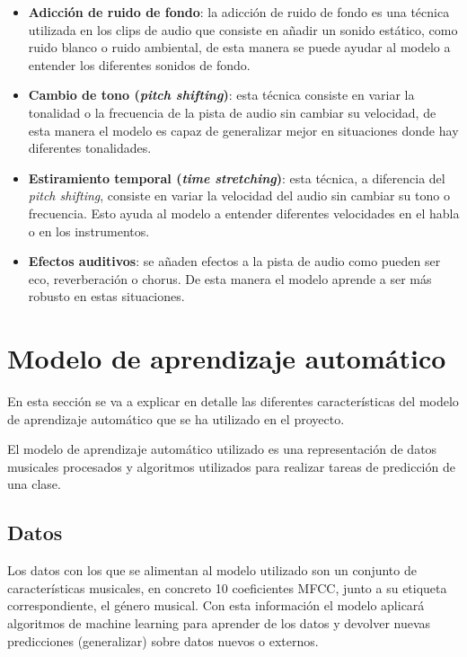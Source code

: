 \begin{itemize}
\tightlist

\item \textbf{Adicción de ruido de fondo}: la adicción de ruido de fondo es una técnica utilizada en los clips de audio que consiste en añadir un sonido estático, como ruido blanco o ruido ambiental, de esta manera se puede ayudar al modelo a entender los diferentes sonidos de fondo.

\item \textbf{Cambio de tono (\textit{pitch shifting})}: esta técnica consiste en variar la tonalidad o la frecuencia de la pista de audio sin cambiar su velocidad, de esta manera el modelo es capaz de generalizar mejor en situaciones donde hay diferentes tonalidades.

\item \textbf{Estiramiento temporal (\textit{time stretching})}: esta técnica, a diferencia del \textit{pitch shifting}, consiste en variar la velocidad del audio sin cambiar su tono o frecuencia. Esto ayuda al modelo a entender diferentes velocidades en el habla o en los instrumentos.

\item \textbf{Efectos auditivos}: se añaden efectos a la pista de audio como pueden ser eco, reverberación o chorus. De esta manera el modelo aprende a ser más robusto en estas situaciones.

\end{itemize}

\newpage

\section{Modelo de aprendizaje automático}

En esta sección se va a explicar en detalle las diferentes características del modelo de aprendizaje automático que se ha utilizado en el proyecto.

El modelo de aprendizaje automático utilizado es una representación de datos musicales procesados y algoritmos utilizados para realizar tareas de predicción de una clase.

\subsection{Datos}

Los datos con los que se alimentan al modelo utilizado son un conjunto de características musicales, en concreto 10 coeficientes MFCC, junto a su etiqueta correspondiente, el género musical. Con esta información el modelo aplicará algoritmos de machine learning para aprender de los datos y devolver nuevas predicciones
(generalizar) sobre datos nuevos o externos.

